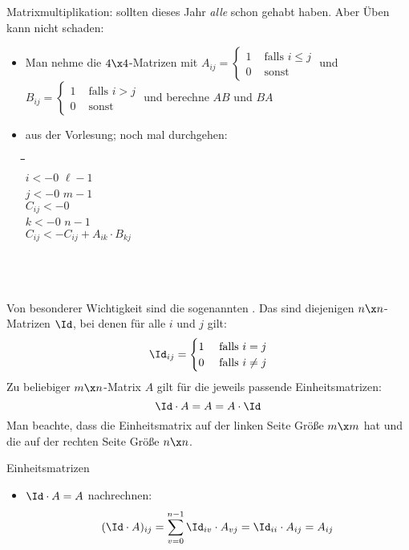\begin{tutorium}
  Matrixmultiplikation: sollten dieses Jahr \emph{alle} schon gehabt
  haben. Aber Üben kann nicht schaden:
  \begin{itemize}
  \item Man nehme \zB die
    $4\x 4$-Matrizen mit $A_{ij} = \begin{cases} 1 & \text{ falls } i\leq j \\
      0 & \text{ sonst} \end{cases}$ und $B_{ij} = \begin{cases} 1 & \text{ falls } i> j \\
      0 & \text{ sonst} \end{cases}$ und berechne $AB$ und $BA$
  \item aus der Vorlesung; noch mal durchgehen:
    \begin{tabbing}
      \quad\=\quad\=\quad\=\quad\=\quad\=\hspace*{30mm}\=\\ \kill
      \> $i <- 0$  $\ell-1$ \\
      \>\> $j <- 0$  $m-1$   \\
      \>\>\>$C_{ij} <- 0$ \\
      \>\>\> $k <- 0$  $n-1$   \\
      \>\>\>\> $C_{ij} <- C_{ij} + A_{ik} \cdot B_{kj}$ \\
      \>\>\> \\
      \>\> \\
      \> \\  
    \end{tabbing}
  \end{itemize}
\end{tutorium}

Von besonderer Wichtigkeit sind die sogenannten
. Das sind diejenigen $n\x
n$-Matrizen $\Id$, bei denen für alle $i$ und $j$ gilt:
\[
\Id_{ij} =
\begin{cases}
  1 & \text{ falls } i=j \\
  0 & \text{ falls } i\not=j
\end{cases}
\]
%
Zu beliebiger $m\x n$-Matrix $A$ gilt für die jeweils passende Einheitsmatrizen:
\[
\Id \cdot A = A = A \cdot \Id
\]
Man beachte, dass die Einheitsmatrix auf der linken Seite Größe $m\x
m$ hat und die auf der rechten Seite Größe $n\x n$.
%
\begin{tutorium}
  Einheitsmatrizen
  \begin{itemize}
  \item $\Id \cdot A=A$ nachrechnen:
    \[
    (\Id\cdot A)_{ij} = \sum_{v=0}^{n-1} \Id_{iv} \cdot A_{vj} =\Id_{ii} \cdot A_{ij} = A_{ij}
    \]
  \end{itemize}
\end{tutorium}

